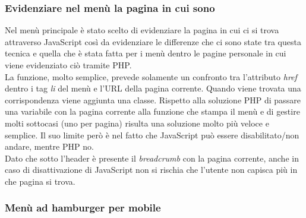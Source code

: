 		\subsubsection{Evidenziare nel menù la pagina in cui sono}
		Nel menù principale è stato scelto di evidenziare la pagina in cui ci si trova attraverso JavaScript così da evidenziare le differenze che ci sono state tra questa tecnica e quella che è stata fatta per i menù dentro le pagine personale in cui viene evidenziato ciò tramite PHP.\\
		La funzione, molto semplice, prevede solamente un confronto tra l'attributo \emph{href} dentro i tag \emph{li} del menù e l'URL della pagina corrente. Quando viene trovata una corrispondenza viene aggiunta una classe.
		Rispetto alla soluzione PHP di passare una variabile con la pagina corrente alla funzione che stampa il menù e di gestire molti sottocasi (uno per pagina) risulta una soluzione molto più veloce e semplice. Il suo limite però è nel fatto che JavaScript può essere disabilitato/non andare, mentre PHP no.\\
		Dato che sotto l'header è presente il \emph{breadcrumb} con la pagina corrente, anche in caso di disattivazione di JavaScript non si rischia che l'utente non capisca più in che pagina si trova.
		
		\subsubsection{Menù ad hamburger per mobile}
		

		


